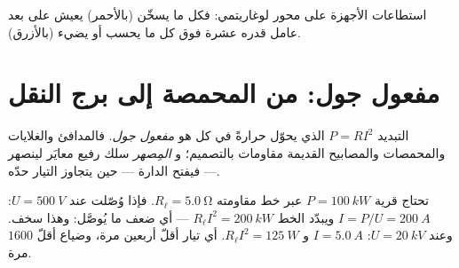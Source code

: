 \begin{omfigure}

{\small استطاعات الأجهزة على محور لوغاريتمي: فكل ما يسخّن
(بالأحمر) يعيش على بعد عامل قدره عشرة فوق كل ما يحسب أو يضيء
(بالأزرق).}
\end{omfigure}

\section{مفعول جول: من المحمصة إلى برج النقل}

\begin{definition}\label{def:g11:circuits-and-power:joule}
التبديد $P = RI^2$ الذي يحوّل  حرارةً في كل
 هو \emph{مفعول جول}. فالمدافئ
والغلايات والمحمصات والمصابيح القديمة مقاومات بالتصميم؛ و
\emph{المِصهر} سلك رفيع معايَر لينصهر --- فيفتح
الدارة --- حين يتجاوز التيار حدّه.
\end{definition}

\begin{example}\label{ex:g11:circuits-and-power:transmission}
تحتاج قرية $P = \qty{100}{kW}$ عبر خط مقاومته
$R_\ell = \qty{5.0}{\ohm}$. فإذا وُصّلت عند $U = \qty{500}{V}$: $I = P/U =
\qty{200}{A}$ ويبدّد الخط $R_\ell I^2 = \qty{200}{kW}$ --- أي ضعف
ما يُوصَّل: وهذا سخف. وعند $U = \qty{20}{kV}$: $I = \qty{5.0}{A}$ و
$R_\ell I^2 = \qty{125}{W}$. أي تيار أقلّ أربعين مرة، وضياع أقلّ $1600$
مرة.
\end{example}

